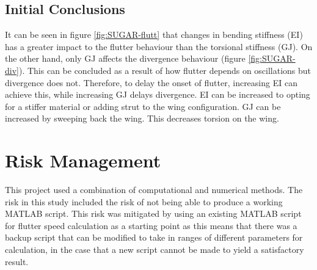 \documentclass[11pt]{article}
\begin{document}
\subsection{Initial Conclusions}

It can be seen in figure \ref{fig:SUGAR-flutt} that changes in bending stiffness (EI) has a greater impact to the flutter behaviour than the torsional stiffness (GJ). On the other hand, only GJ affects the divergence behaviour (figure \ref{fig:SUGAR-div}). This can be concluded as a result of how flutter depends on oscillations but divergence does not. Therefore, to delay the onset of flutter, increasing EI can achieve this, while increasing GJ delays divergence. EI can be increased to opting for a stiffer material or adding strut to the wing configuration. GJ can be increased by sweeping back the wing. This decreases torsion on the wing.

\section{Risk Management}
\label{sec:risk}
This project used a combination of computational and numerical methods. The risk in this study included the risk of not being able to produce a working MATLAB script. This risk was mitigated by using an existing MATLAB script \cite{Wright2015INTRODUCTIONLOADS} for flutter speed calculation as a starting point as this means that there was a backup script that can be modified to take in ranges of different parameters for calculation, in the case that a new script cannot be made to yield a satisfactory result.\\
\end{document}
